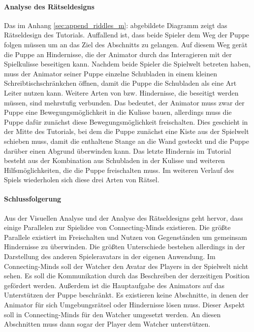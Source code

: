 \paragraph{Analyse des Rätseldesigns}
Das im Anhang \ref{sec:append_riddles_m}:  abgebildete Diagramm zeigt das Rätseldesign des Tutorials. Auffallend ist, dass beide Spieler dem Weg der Puppe folgen müssen um an das Ziel des Abschnitts zu gelangen. Auf diesem Weg gerät die Puppe an Hindernisse, die der Animator durch das Interagieren mit der Spielkulisse beseitigen kann. Nachdem beide Spieler die Spielwelt betreten haben, muss der Animator seiner Puppe einzelne Schubladen in einem kleinen Schreibtischschränkchen öffnen, damit die Puppe die Schubladen als eine Art Leiter nutzen kann. Weitere Arten von  bzw. Hindernisse, die beseitigt werden müssen, sind mehrstufig verbunden. Das bedeutet, der Animator muss zwar der Puppe eine Bewegungsmöglichkeit in die Kulisse bauen, allerdings muss die Puppe dafür zunächst diese Bewegungsmöglichkeit freischalten. Dies geschieht in der Mitte des Tutorials, bei dem die Puppe zunächst eine Kiste aus der Spielwelt schieben muss, damit die enthaltene Stange an die Wand gesteckt und die Puppe darüber einen Abgrund überwinden kann.
Das letzte Hindernis im Tutorial besteht aus der Kombination aus Schubladen in der Kulisse und weiteren Hilfsmöglichkeiten, die die Puppe freischalten muss. Im weiteren Verlauf des Spiels wiederholen sich diese drei Arten von Rätsel. 

\paragraph{Schlussfolgerung}
Aus der Visuellen Analyse und der Analyse des Rätseldesigns geht hervor, dass einige Parallelen zur Spielidee von Connecting-Minds existieren. Die größte Parallele existiert im Freischalten und Nutzen von Gegenständen um gemeinsam Hindernisse zu überwinden. Die größten Unterschiede bestehen allerdings in der Darstellung des anderen Spieleravatars in der eigenen Anwendung. Im Connecting-Minds soll der Watcher den Avatar des Players in der Spielwelt nicht sehen. Es soll die Kommunikation durch das Beschreiben der derzeitigen Position gefördert werden. Außerdem ist die Hauptaufgabe des Animators auf das Unterstützen der Puppe beschränkt. Es existieren keine Abschnitte, in denen der Animator für sich Umgebungsrätsel oder Hindernisse lösen muss. Dieser Aspekt soll in Connecting-Minds für den Watcher umgesetzt werden. An diesen Abschnitten muss dann sogar der Player dem Watcher unterstützen. 

